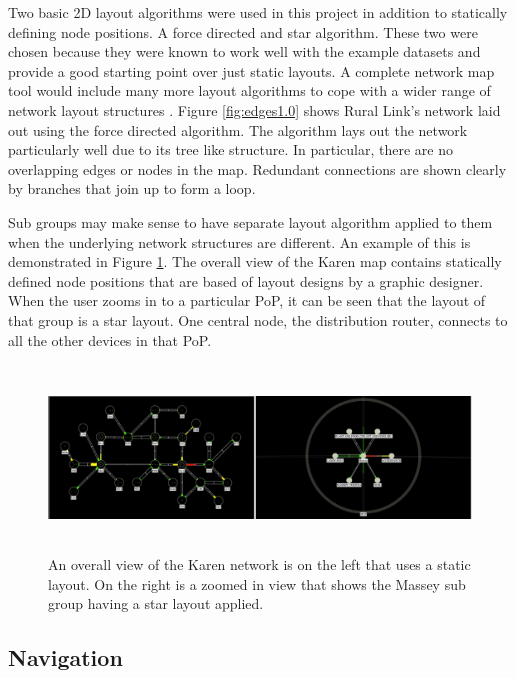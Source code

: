 \documentclass[11pt, a4paper]{article}
\begin{document}
Two basic 2D layout algorithms were used in this project in addition to
statically defining node positions. A force directed and star algorithm. These
two were chosen because they were known to work well with the example datasets
and provide a good starting point over just static layouts. A complete network
map tool would include many more layout algorithms to cope with a wider range of
network layout structures \cite{Paul_2000}. Figure \ref{fig:edges1.0} shows
Rural Link's network laid out using the force directed algorithm. The algorithm
lays out the network particularly well due to its tree like structure. In
particular, there are no overlapping edges or nodes in the map. Redundant
connections are shown clearly by branches that join up to form a loop. 

Sub groups may make sense to have separate layout algorithm applied to them when
the underlying network structures are different. An example of this is
demonstrated in Figure \ref{fig:layouts1.1}. The overall view of the Karen map
contains statically defined node positions that are based of layout designs by a
graphic designer. When the user zooms in to a particular PoP, it can be seen
that the layout of that group is a star layout. One central node, the
distribution router, connects to all the other devices in that PoP.

\begin{figure}
\centering
\includegraphics[width=170mm,height=49.34mm]{assets/layouts1-1.eps}
\caption{An overall view of the Karen network is on the left that uses a static
layout. On the right is a zoomed in view that shows the Massey sub group having 
a star layout applied.}
\label{fig:layouts1.1}
\end{figure}


\subsection{Navigation}
\label{sec:navigation.vis}
\end{document}
